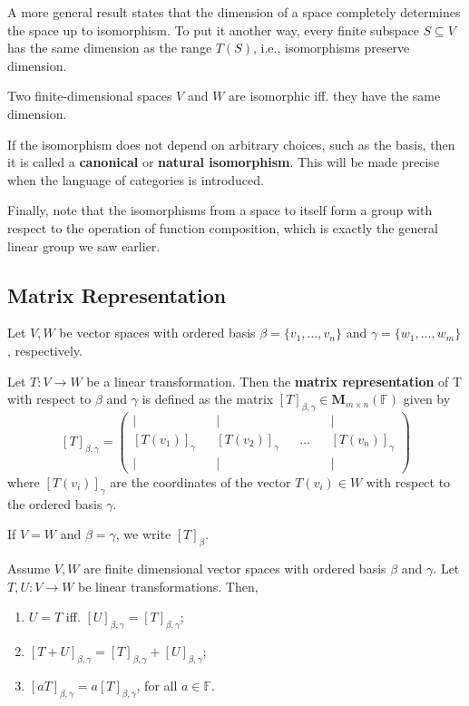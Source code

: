 A more general result states that the dimension of a space completely determines the space up to isomorphism. To put it another way, every finite subspace $S \subseteq V$ has the same dimension as the range $T(S)$, i.e., isomorphisms preserve dimension.

\begin{theorem}
	Two finite-dimensional spaces $V$ and $W$ are isomorphic iff. they have the same dimension.
\end{theorem}

If the isomorphism does not depend on arbitrary choices, such as the basis, then it is called a \textbf{canonical} or \textbf{natural isomorphism}. This will be made precise when the language of categories is introduced.

Finally, note that the isomorphisms from a space to itself form a group with respect to the operation of function composition, which is exactly the general linear group we saw earlier.

\subsection*{Matrix Representation}

\begin{definition}
	Let $V, W$ be vector spaces with ordered basis $\beta = \{ v_1, \ldots, v_n \}$ and $\gamma = \{ w_1, \ldots, w_m \}$, respectively.

	Let $T : V \longrightarrow W$ be a linear transformation. Then the \textbf{matrix representation} of T with respect to $\beta$ and $\gamma$ is defined as the matrix $[T]_{\beta, \gamma} \in \textbf{M}_{m \times n}(\mathbb{F})$ given by 
	\[
		[T]_{\beta, \gamma} = \left(\begin{matrix}
			\big| && \big| && && \big| \\
			[T(v_1)]_\gamma &&  [T(v_2)]_\gamma && \ldots && [T(v_n)]_\gamma \\
			\big| && \big| && && \big|
			\end{matrix}\right)
	\]
	where $[T(v_i)]_\gamma$ are the coordinates of the vector $T(v_i) \in W$ with respect to the ordered basis $\gamma$.

	If $V = W$ and $\beta = \gamma$, we write $[T]_\beta$.
\end{definition}

\begin{theorem}
	Assume $V, W$ are finite dimensional vector spaces with ordered basis $\beta$ and $\gamma$. Let $T, U : V \longrightarrow W$ be linear transformations. Then,
	\begin{enumerate}
		\item $U = T$ iff. $[U]_{\beta,\gamma} = [T]_{\beta,\gamma}$;
		\item $[T+U]_{\beta,\gamma} = [T]_{\beta,\gamma} + [U]_{\beta,\gamma}$;
		\item $[aT]_{\beta,\gamma} = a[T]_{\beta,\gamma}$, for all $a \in \mathbb{F}$.
	\end{enumerate}
\end{theorem}

